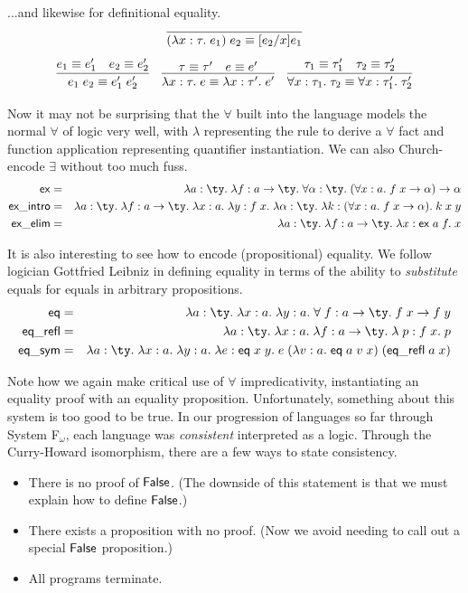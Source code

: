 \documentclass{amsbook}
\theoremstyle{definition}
\theoremstyle{remark}
\numberwithin{section}{chapter}
\numberwithin{equation}{chapter}
\begin{document}
\noindent ...and likewise for definitional equality.
$$\infer{(\lambda x : \tau. \; e_1) \; e_2 \equiv \subst{e_1}{x}{e_2}}{}$$
$$\infer{e_1 \; e_2 \equiv e'_1 \; e'_2}{
  e_1 \equiv e'_1
  & e_2 \equiv e'_2
}
\quad \infer{\lambda x : \tau. \; e \equiv \lambda x : \tau'. \; e'}{
  \tau \equiv \tau'
  & e \equiv e'
}
\quad \infer{\forall x : \tau_1. \; \tau_2 \equiv \forall x : \tau'_1. \; \tau'_2}{
  \tau_1 \equiv \tau'_1
  & \tau_2 \equiv \tau'_2
}$$

Now it may not be surprising that the $\forall$ built into the language models the normal $\forall$ of logic very well, with $\lambda$ representing the rule to derive a $\forall$ fact and function application representing quantifier instantiation.
We can also Church-encode $\exists$ without too much fuss.
\begin{eqnarray*}
  \lc{ex} &=& \lambda a : \ty. \; \lambda f : a \to \ty. \; \forall \alpha : \ty. \; (\forall x : a. \; f \; x \to \alpha) \to \alpha \\
  \lc{ex\_intro} &=& \lambda a : \ty. \; \lambda f : a \to \ty. \; \lambda x : a. \; \lambda y : f \; x. \; \lambda \alpha : \ty. \; \lambda k : (\forall x : a. \; f \; x \to \alpha). \; k \; x \; y \\
  \lc{ex\_elim} &=& \lambda a : \ty. \; \lambda f : a \to \ty. \; \lambda x : \lc{ex} \; a \; f. \; x
\end{eqnarray*}

It is also interesting to see how to encode (propositional) equality.
We follow logician Gottfried Leibniz in defining equality in terms of the ability to \emph{substitute} equals for equals in arbitrary propositions.
\begin{eqnarray*}
  \lc{eq} &=& \lambda a : \ty. \; \lambda x : a. \; \lambda y : a. \; \forall \; f : a \to \ty. \; f \; x \to f \; y \\
  \lc{eq\_refl} &=& \lambda a : \ty. \; \lambda x : a. \; \lambda f : a \to \ty. \; \lambda \; p : f \; x. \; p \\
  \lc{eq\_sym} &=& \lambda a : \ty. \; \lambda x : a. \; \lambda y : a. \; \lambda e : \lc{eq} \; x \; y. \; e \; (\lambda v : a. \; \lc{eq} \; a \; v \; x) \; (\lc{eq\_refl} \; a \; x)
\end{eqnarray*}

Note how we again make critical use of $\forall$ impredicativity, instantiating an equality proof with an equality proposition.
Unfortunately, something about this system is too good to be true.
In our progression of languages so far through System F$_\omega$, each language was \emph{consistent} interpreted as a logic.
Through the Curry-Howard isomorphism, there are a few ways to state consistency.
\begin{itemize}
\item There is no proof of $\mathsf{False}$.  (The downside of this statement is that we must explain how to define $\mathsf{False}$.)
\item There exists a proposition with no proof.  (Now we avoid needing to call out a special $\mathsf{False}$ proposition.)
\item All programs terminate.
\end{itemize}
\end{document}
